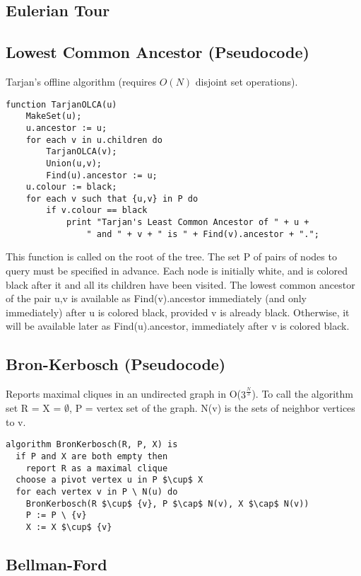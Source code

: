 \documentclass[9pt]{extarticle}
\begin{document}
\begin{multicols*}{3}
\subsection{Eulerian Tour}


\subsection{Lowest Common Ancestor (Pseudocode)} %
Tarjan's offline algorithm (requires $O(N)$ disjoint set operations).
\begin{lstlisting}
function TarjanOLCA(u)
    MakeSet(u);
    u.ancestor := u;
    for each v in u.children do
        TarjanOLCA(v);
        Union(u,v);
        Find(u).ancestor := u;
    u.colour := black;
    for each v such that {u,v} in P do
        if v.colour == black
            print "Tarjan's Least Common Ancestor of " + u +
                " and " + v + " is " + Find(v).ancestor + ".";
\end{lstlisting}
This function is called on the root of the tree. The set P of pairs of nodes to
query must be specified in advance. Each node is initially white, and is
colored black after it and all its children have been visited. The lowest
common ancestor of the pair {u,v} is available as Find(v).ancestor immediately
(and only immediately) after u is colored black, provided v is already black.
Otherwise, it will be available later as Find(u).ancestor, immediately after v
is colored black.

\subsection{Bron-Kerbosch (Pseudocode)}
Reports maximal cliques in an undirected graph in O($3^{\frac{N}{3}}$).
To call the algorithm set R = X = $\emptyset$, P = vertex set of the graph.
N(v) is the sets of neighbor vertices to v.
\begin{lstlisting}[mathescape=true]
algorithm BronKerbosch(R, P, X) is
  if P and X are both empty then
    report R as a maximal clique
  choose a pivot vertex u in P $\cup$ X
  for each vertex v in P \ N(u) do
    BronKerbosch(R $\cup$ {v}, P $\cap$ N(v), X $\cap$ N(v))
    P := P \ {v}
    X := X $\cup$ {v}
\end{lstlisting}

\subsection{Bellman-Ford}



\end{multicols*}
\end{document}
